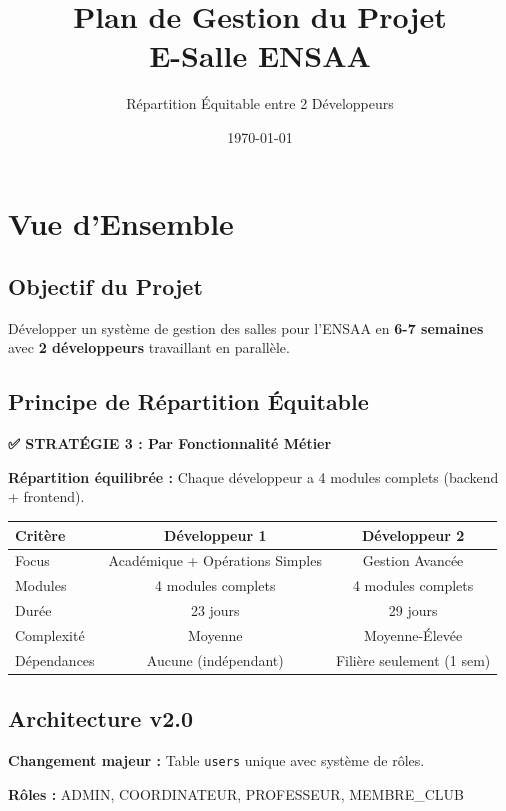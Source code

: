 \documentclass[12pt,a4paper]{article}
\title{\textbf{Plan de Gestion du Projet\\E-Salle ENSAA}}
\author{Répartition Équitable entre 2 Développeurs}
\date{\today}
\begin{document}
\maketitle
\tableofcontents
\newpage

\section{Vue d'Ensemble}

\subsection{Objectif du Projet}

Développer un système de gestion des salles pour l'ENSAA en \textbf{6-7 semaines} avec \textbf{2 développeurs} travaillant en parallèle.

\subsection{Principe de Répartition Équitable}

\textbf{✅ STRATÉGIE 3 : Par Fonctionnalité Métier}

\textbf{Répartition équilibrée :} Chaque développeur a 4 modules complets (backend + frontend).

\begin{center}
\begin{tabular}{|l|c|c|}
\hline
\textbf{Critère} & \textbf{Développeur 1} & \textbf{Développeur 2} \\
\hline
Focus & Académique + Opérations Simples & Gestion Avancée \\
\hline
Modules & 4 modules complets & 4 modules complets \\
\hline
Durée & 23 jours & 29 jours \\
\hline
Complexité & Moyenne & Moyenne-Élevée \\
\hline
Dépendances & Aucune (indépendant) & Filière seulement (1 sem) \\
\hline
\end{tabular}
\end{center}

\subsection{Architecture v2.0}

\textbf{Changement majeur :} Table \texttt{users} unique avec système de rôles.

\textbf{Rôles :} ADMIN, COORDINATEUR, PROFESSEUR, MEMBRE\_CLUB
\end{document}
